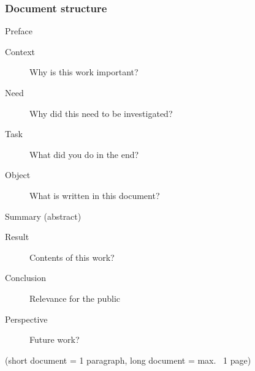 \documentclass[aspectratio=169]{beamer}
\begin{document}
\begin{frame}
  \frametitle{Document structure}
  
  Preface
  
  \begin{description}
    \item[Context] Why is this work important?
    \item[Need] Why did this need to be investigated?
    \item[Task] What did you do in the end?
    \item[Object] What is written in this document?
  \end{description}
  
  Summary (abstract)
  
  \begin{description}
    \item[Result] Contents of this work?
    \item[Conclusion] Relevance for the public
    \item[Perspective] Future work?
  \end{description}
  
  (short document = 1 paragraph, long document = max. ~1 page)
\end{frame}
\end{document}
